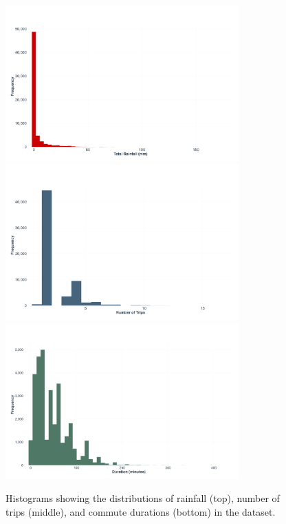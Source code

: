 \begin{figure}
    \centering
    \includegraphics[width=0.8\textwidth]{../figures/rainfall_histogram.png}
    \includegraphics[width=0.8\textwidth]{../figures/trips_histogram.png}
    \includegraphics[width=0.8\textwidth]{../figures/duration_histogram.png}
    \caption{Histograms showing the distributions of rainfall (top), number of trips (middle), and commute durations (bottom) in the dataset.}
    \label{fig:hist}
\end{figure}

